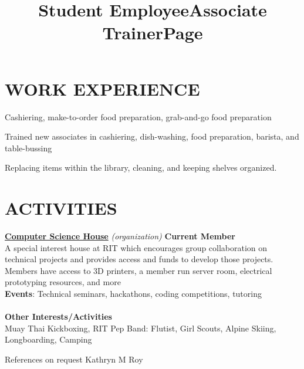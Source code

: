\documentclass[line,margin]{res}
\begin{document}
\begin{resume}
\section{WORK EXPERIENCE}
\title{\textbf{Student Employee}}
\begin{position}
    Cashiering, make-to-order food preparation, grab-and-go food preparation
\end{position}
\title{\textbf{Associate Trainer}}
\begin{position}
    Trained new associates in cashiering, dish-washing, food preparation, barista, and table-bussing
\end{position}
\title{\textbf{Page}}
\begin{position}
    Replacing items within the library, cleaning, and keeping shelves organized.
\end{position}

\section{ACTIVITIES}
\href{https://csh.rit.edu}{\textbf{Computer Science House}}
{\sl (organization)}\hfill
\textbf{Current Member}\\
A special interest house at RIT which encourages group collaboration on technical 
projects and provides access and funds to develop those projects. Members have 
access to 3D printers, a member run server room, electrical prototyping 
resources, and more\\
\textbf{Events}: 
Technical seminars, hackathons, coding competitions, tutoring\\\\
\textbf{Other Interests/Activities}\\
Muay Thai Kickboxing, RIT Pep Band: Flutist, Girl Scouts, Alpine Skiing, Longboarding, Camping

\end{resume}

\scriptsize{References on request} \hfill 
\scriptsize{Kathryn M Roy} \hfill 
\end{document}
